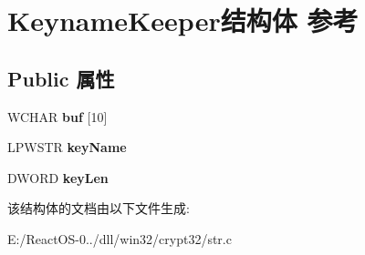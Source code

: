 \hypertarget{struct_keyname_keeper}{}\section{Keyname\+Keeper结构体 参考}
\label{struct_keyname_keeper}
\subsection*{Public 属性}
\begin{DoxyCompactItemize}
\item 
\mbox{\label{struct_keyname_keeper_ae933b8e687fa85e2f15823bf0fc93987}} 
W\+C\+H\+AR {\bfseries buf} \mbox{[}10\mbox{]}
\item 
\mbox{\label{struct_keyname_keeper_a52883a826bff7cd28ecde6a7e56d067f}} 
L\+P\+W\+S\+TR {\bfseries key\+Name}
\item 
\mbox{\label{struct_keyname_keeper_a05167d6ce9b1afda4122ef27c2567d04}} 
D\+W\+O\+RD {\bfseries key\+Len}
\end{DoxyCompactItemize}


该结构体的文档由以下文件生成\+:\begin{DoxyCompactItemize}
\item 
E\+:/\+React\+O\+S-\/0../dll/win32/crypt32/str.\+c\end{DoxyCompactItemize}

